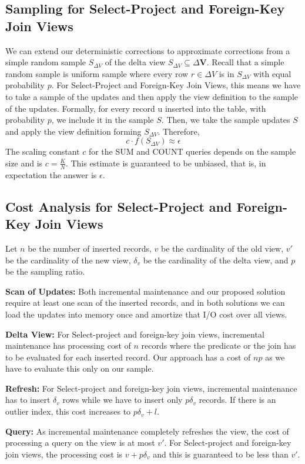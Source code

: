 \subsection{Sampling for Select-Project and Foreign-Key Join Views}
We can extend our deterministic corrections to approximate corrections from a 
simple random sample $S_{\Delta V}$ of the delta view $S_{\Delta V}\subseteq\Delta\textbf{V}$. 
Recall that a simple random sample is uniform sample where every row $r\in\Delta V$
is in $S_{\Delta V}$ with equal probability $p$. For Select-Project
and Foreign-Key Join Views, this means we have to take a sample of
the updates and then apply the view definition to the sample of the
updates. Formally, for every record u inserted into the table, with
probability $p$, we include it in the sample $S$. Then, we take
the sample updates $S$ and apply the view definition forming $S_{\Delta V}$.
Therefore,
\[
c\cdot f(S_{\Delta V})\approx\epsilon
\]
The scaling constant $c$ for the SUM and COUNT queries
depends on the sample size and is $c = \frac{K}{N}$.
This estimate is guaranteed to be unbiased, that is, in expectation the answer is $\epsilon$.

\subsection{Cost Analysis for Select-Project and Foreign-Key Join Views}
Let $n$ be the number of inserted records, $v$ be the cardinality of the old view, $v'$ be the cardinality of the new view, $\delta_v$ be the cardinality of the delta view, and $p$ be the sampling ratio.  

\textbf{Scan of Updates: }
Both incremental maintenance and our proposed solution require at least one scan of the inserted records, and in both solutions we can
load the updates into memory once and amortize that I/O cost over all views. 

\textbf{Delta View: } For Select-project and foreign-key join views, incremental maintenance has processing cost of $n$ records where the predicate or the join has to be evaluated for each inserted record. Our approach has a cost of $np$ as we have to evaluate this only on our sample. 

\textbf{Refresh: } For Select-project and foreign-key join views, incremental maintenance has to insert $\delta_v$ rows while we have to insert only $p\delta_v$ records. If there is an outlier index, this cost increases to $p\delta_v + l$. 

\textbf{Query: } As incremental maintenance completely refreshes the view, the cost of processing a query on the view is at most $v'$. For Select-project and foreign-key join views, the processing cost is $v + p\delta_v$ and this is guaranteed to be less than $v'$. 

